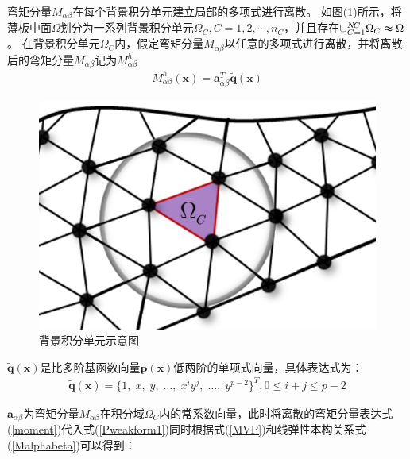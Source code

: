 弯矩分量$M_{\alpha\beta}$在每个背景积分单元建立局部的多项式进行离散。
如图(\ref{momentlisan})所示，将薄板中面$\Omega$划分为一系列背景积分单元$\Omega_C,C=1,2,\dotsb,n_C$，并且存在$\cup_{C=1}^{N\!C}\Omega_C\thickapprox\Omega$。
在背景积分单元$\Omega_C$内，假定弯矩分量$M_{\alpha\beta}$以任意的多项式进行离散，并将离散后的弯矩分量$M_{\alpha\beta}$记为$M_{\alpha\beta}^h$
\begin{equation}\label{moment}
\begin{split}
    M^h_{\alpha\beta}(\pmb{x})=\pmb{a}_{\alpha\beta}^T\tilde{\pmb{q}}(\pmb{x})
\end{split}
\end{equation}
\begin{figure}[H]
    \centering
    \includegraphics[scale=0.5]{figure/PHR/momentlisan.png}
    \caption{背景积分单元示意图}\label{momentlisan}
\end{figure}
$\tilde{\pmb{q}}(\pmb{x})$是比多阶基函数向量$\pmb{p}(\pmb{x})$低两阶的单项式向量，具体表达式为：
\begin{equation}
\begin{split}
    \tilde{\pmb{q}}(\pmb{x})=\{1,\;x,\;y,\;\dots,\;x^iy^j,\;\dots,\;y^{p-2}\}^T,0 \le i+j \le p-2
\end{split}
\end{equation}\par
$\pmb{a}_{\alpha\beta}$为弯矩分量$M_{\alpha\beta}$在积分域$\Omega_C$内的常系数向量，此时将离散的弯矩分量表达式(\ref{moment})代入式(\ref{Pweakform1})同时根据式(\ref{MVP})和线弹性本构关系式(\ref{Malphabeta})可以得到：
